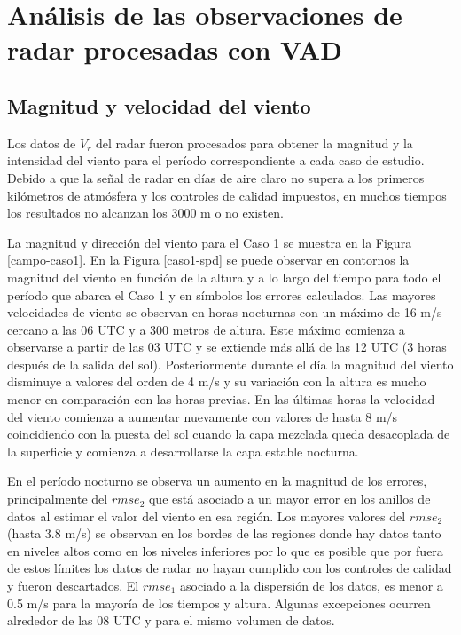 \documentclass[12pt,spanish,oneside]{book}
\begin{document}
\section{Análisis de las observaciones de radar procesadas con
VAD}\label{analisis-de-las-observaciones-de-radar-procesadas-con-vad}

\subsection{Magnitud y velocidad del
viento}\label{magnitud-y-velocidad-del-viento}

Los datos de \(V_r\) del radar fueron procesados para obtener la
magnitud y la intensidad del viento para el período correspondiente a
cada caso de estudio. Debido a que la señal de radar en días de aire
claro no supera a los primeros kilómetros de atmósfera y los controles
de calidad impuestos, en muchos tiempos los resultados no alcanzan los
3000 m o no existen.

La magnitud y dirección del viento para el Caso 1 se muestra en la
Figura \ref{campo-caso1}. En la Figura \ref{caso1-spd} se puede observar
en contornos la magnitud del viento en función de la altura y a lo largo
del tiempo para todo el período que abarca el Caso 1 y en símbolos los
errores calculados. Las mayores velocidades de viento se observan en
horas nocturnas con un máximo de 16 m/s cercano a las 06 UTC y a 300
metros de altura. Este máximo comienza a observarse a partir de las 03
UTC y se extiende más allá de las 12 UTC (3 horas después de la salida
del sol). Posteriormente durante el día la magnitud del viento disminuye
a valores del orden de 4 m/s y su variación con la altura es mucho menor
en comparación con las horas previas. En las últimas horas la velocidad
del viento comienza a aumentar nuevamente con valores de hasta 8 m/s
coincidiendo con la puesta del sol cuando la capa mezclada queda
desacoplada de la superficie y comienza a desarrollarse la capa estable
nocturna.

En el período nocturno se observa un aumento en la magnitud de los
errores, principalmente del \(rmse_2\) que está asociado a un mayor
error en los anillos de datos al estimar el valor del viento en esa
región. Los mayores valores del \(rmse_2\) (hasta 3.8 m/s) se observan
en los bordes de las regiones donde hay datos tanto en niveles altos
como en los niveles inferiores por lo que es posible que por fuera de
estos límites los datos de radar no hayan cumplido con los controles de
calidad y fueron descartados. El \(rmse_1\) asociado a la dispersión de
los datos, es menor a 0.5 m/s para la mayoría de los tiempos y altura.
Algunas excepciones ocurren alrededor de las 08 UTC y para el mismo
volumen de datos.
\end{document}
